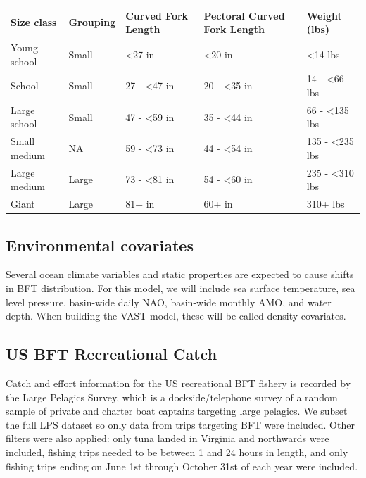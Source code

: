 \documentclass[
]{article}
\let\origtable\table
\let\endorigtable\endtable
\renewenvironment{table}[1][2] {
    \expandafter\origtable\expandafter[H]
} {
    \endorigtable
}
\begin{document}
\begin{table}[H]

\caption{\label{tab:size-table}Bluefin tuna size classes}
\centering
\begin{tabular}[t]{lllll}
\toprule
Size class & Grouping & Curved Fork
Length & Pectoral Curved
Fork Length & Weight (lbs)\\
\midrule
Young school & Small & <27 in & <20 in & <14 lbs\\
School & Small & 27 - <47 in & 20 - <35 in & 14 - <66 lbs\\
Large school & Small & 47 - <59 in & 35 - <44 in & 66 - <135 lbs\\
Small medium & NA & 59 - <73 in & 44 - <54 in & 135 - <235 lbs\\
Large medium & Large & 73 - <81 in & 54 - <60 in & 235 - <310 lbs\\
\addlinespace
Giant & Large & 81+ in & 60+ in & 310+ lbs\\
\bottomrule
\end{tabular}
\end{table}

\hypertarget{environmental-covariates}{%
\subsection{Environmental covariates}\label{environmental-covariates}}

Several ocean climate variables and static properties are expected to cause shifts in BFT distribution. For this model, we will include sea surface temperature, sea level pressure, basin-wide daily NAO, basin-wide monthly AMO, and water depth. When building the VAST model, these will be called density covariates.

\hypertarget{us-bft-recreational-catch}{%
\subsection{US BFT Recreational Catch}\label{us-bft-recreational-catch}}

Catch and effort information for the US recreational BFT fishery is recorded by the Large Pelagics Survey, which is a dockside/telephone survey of a random sample of private and charter boat captains targeting large pelagics. We subset the full LPS dataset so only data from trips targeting BFT were included. Other filters were also applied: only tuna landed in Virginia and northwards were included, fishing trips needed to be between 1 and 24 hours in length, and only fishing trips ending on June 1st through October 31st of each year were included.
\end{document}
